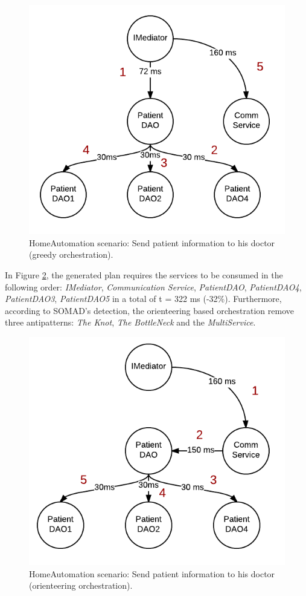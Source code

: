 \documentclass[lnbip]{svmultln}
\begin{document}
\begin{figure}
    \centering
	\includegraphics[scale=0.35]{scenario2.png}
 	\caption{HomeAutomation scenario: Send patient information to his doctor (greedy orchestration).}
    \label{fig:scenario2}
\end{figure}

In Figure \ref{fig:scenario3}, the generated plan requires the services to be consumed in the following order: \textit{IMediator}, \textit{Communication Service}, \textit{PatientDAO}, \textit{PatientDAO4}, \textit{PatientDAO3}, \textit{PatientDAO5} in a total of t = 322 ms (-32\%). Furthermore, according to SOMAD's detection, the orienteering based orchestration remove three antipatterns: \textit{The Knot}, \textit{The BottleNeck} and the \textit{MultiService}.  

\begin{figure}
    \centering
	\includegraphics[scale=0.35]{scenario3.png}
 	\caption{HomeAutomation scenario: Send patient information to his doctor (orienteering orchestration).}
    \label{fig:scenario3}
\end{figure}
\end{document}
